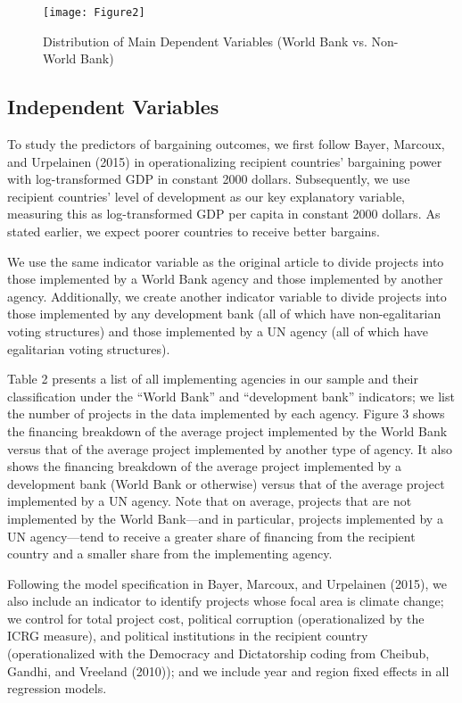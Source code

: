 \documentclass{article}
\begin{document}
\begin{figure}[H]
	\centering
	\caption{Distribution of Main Dependent Variables (World Bank vs. Non-World Bank)}
	\texttt{[image: Figure2]}
	\label{fig:figure2}
\end{figure} 

\subsection{Independent Variables}
To study the predictors of bargaining outcomes, we first follow Bayer, Marcoux, and Urpelainen (2015) in operationalizing recipient countries’ bargaining power with log-transformed GDP in constant 2000 dollars.  Subsequently, we use recipient countries’ level of development as our key explanatory variable, measuring this as log-transformed GDP per capita in constant 2000 dollars.  As stated earlier, we expect poorer countries to receive better bargains. 

We use the same indicator variable as the original article to divide projects into those implemented by a World Bank agency and those implemented by another agency.  Additionally, we create another indicator variable to divide projects into those implemented by any development bank (all of which have non-egalitarian voting structures) and those implemented by a UN agency (all of which have egalitarian voting structures).  

Table 2 presents a list of all implementing agencies in our sample and their classification under the “World Bank” and “development bank” indicators; we list the number of projects in the data implemented by each agency.  Figure 3 shows the financing breakdown of the average project implemented by the World Bank versus that of the average project implemented by another type of agency.  It also shows the financing breakdown of the average project implemented by a development bank (World Bank or otherwise) versus that of the average project implemented by a UN agency.  Note that on average, projects that are not implemented by the World Bank---and in particular, projects implemented by a UN agency---tend to receive a greater share of financing from the recipient country and a smaller share from the implementing agency. 
 
Following the model specification in Bayer, Marcoux, and Urpelainen (2015), we also include an indicator to identify projects whose focal area is climate change; we control for total project cost, political corruption (operationalized by the ICRG measure), and political institutions in the recipient country (operationalized with the Democracy and Dictatorship coding from Cheibub, Gandhi, and Vreeland (2010)); and we include year and region fixed effects in all regression models.
\end{document}
